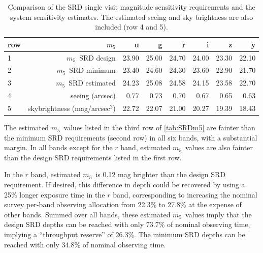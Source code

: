 \documentclass[PST,authoryear,toc]{lsstdoc}
\newcommand{\cm}{\ensuremath{C_m}}
\newcommand{\mf}{\ensuremath{m_5}}
\begin{document}
\begin{table}[ht!]
\caption{Comparison of the SRD single visit magnitude sensitivity requirements and the system sensitivity estimates. The %
 estimated seeing and sky brightness are also included (row 4 and 5).}\label{tab:SRDm5}
\footnotesize
\vskip 0.05in
\centering
\begin{tabular}{lrrrrrrr}
\hline
row & {\mf} &       u &       g &       r &       i &       z &       y \\
\hline
1 & \mf\ SRD design                 &  23.90 &  25.00 &  24.70 &  24.00 &  23.30 &  22.10 \\
2 & \mf\ SRD minimum                &  23.40 &  24.60 &  24.30 &  23.60 &  22.90 &  21.70 \\
3 & \mf\ SRD estimated         &  24.23 &  25.08 &  24.58 &  24.15 &  23.58 &  22.70 \\
\hline
4 & seeing (arcsec)                    &   0.77 &   0.73 &   0.70 &   0.67 &   0.65 &   0.63 \\
5 & skybrightness  (mag/arcsec$^2$)            &  22.72 &  22.07 &  21.00 &  20.27 &  19.39 &  18.43 \\
\hline
\end{tabular}
\end{table}

\FloatBarrier




The estimated \mf\ values listed in the third row of \autoref{tab:SRDm5} are fainter
than the minimum SRD requirements (second row) in all six bands, with a substantial
margin. In all bands except for the $r$ band, estimated \mf\ values are also fainter
than the design SRD requirements listed in the first row.

In the $r$ band, estimated \mf\ is 0.12 mag brighter than the design SRD requirement.
If desired, this difference in depth could be recovered by using a 25\% longer exposure
time in the $r$ band, corresponding to increasing the nominal survey per-band observing
allocation from 22.3\% to 27.8\% at the expense of other bands. Summed over
all bands, these estimated \mf\ values imply that the design SRD depths can be
reached with only 73.7\% of nominal observing time, implying a ``throughput reserve''
of 26.3\%. The minimum SRD depths can be reached with only 34.8\% of nominal observing time.
\end{document}

